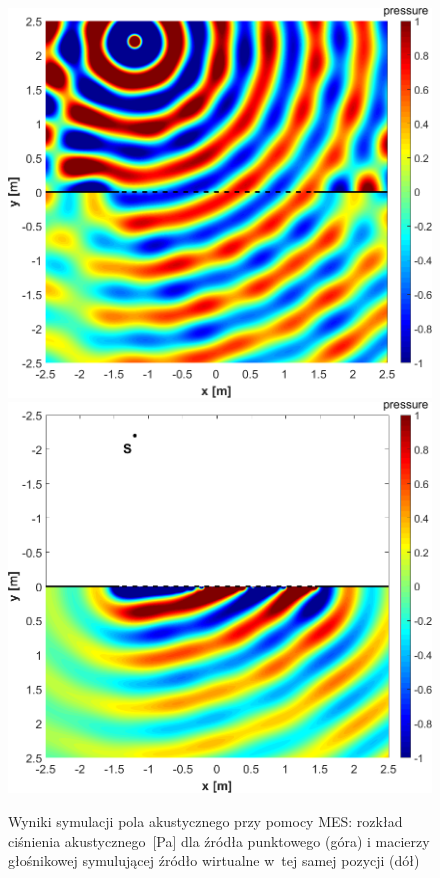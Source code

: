 \documentclass[12pt]{oska}
\begin{document}
\begin{figure}[!ht]
  \centering
  \includegraphics[height=.41\textheight]{bitgraphics/real_500Hz.png}
  \includegraphics[height=.41\textheight]{bitgraphics/virtual_500Hz.png}
  \caption{Wyniki symulacji pola akustycznego przy pomocy MES:
    rozkład ciśnienia akustycznego~[Pa] dla źródła punktowego (góra) i macierzy głośnikowej
  symulującej źródło wirtualne w~tej samej pozycji (dół)}
  \label{r:fem}
\end{figure}
\end{document}
